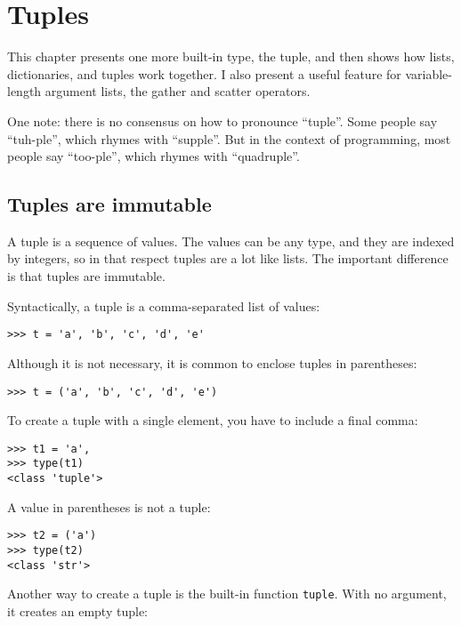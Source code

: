 \documentclass[10pt]{book}
\begin{document}
\chapter{Tuples}
\label{tuplechap}

This chapter presents one more built-in type, the tuple, and then
shows how lists, dictionaries, and tuples work together.
I also present a useful feature for variable-length argument lists,
the gather and scatter operators.

One note: there is no consensus on how to pronounce ``tuple''.
Some people say ``tuh-ple'', which rhymes with ``supple''.  But
in the context of programming, most people say ``too-ple'', which
rhymes with ``quadruple''.


\section{Tuples are immutable}

A tuple is a sequence of values.  The values can be any type, and
they are indexed by integers, so in that respect tuples are a lot
like lists.  The important difference is that tuples are immutable.

Syntactically, a tuple is a comma-separated list of values:

\begin{verbatim}
>>> t = 'a', 'b', 'c', 'd', 'e'
\end{verbatim}
%
Although it is not necessary, it is common to enclose tuples in
parentheses:

\begin{verbatim}
>>> t = ('a', 'b', 'c', 'd', 'e')
\end{verbatim}
%
To create a tuple with a single element, you have to include a final
comma:

\begin{verbatim}
>>> t1 = 'a',
>>> type(t1)
<class 'tuple'>
\end{verbatim}
%
A value in parentheses is not a tuple:

\begin{verbatim}
>>> t2 = ('a')
>>> type(t2)
<class 'str'>
\end{verbatim}
%
Another way to create a tuple is the built-in function {\tt tuple}.
With no argument, it creates an empty tuple:
\end{document}
